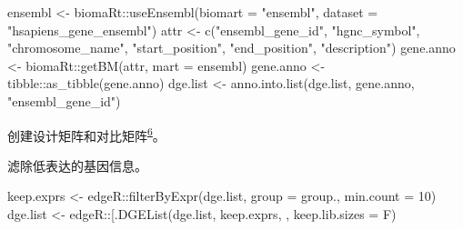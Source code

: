 \documentclass[
]{article}
\newenvironment{Shaded}{\begin{snugshade}}{\end{snugshade}}
\newcommand{\AttributeTok}[1]{\textcolor[rgb]{0.77,0.63,0.00}{#1}}
\newcommand{\DecValTok}[1]{\textcolor[rgb]{0.00,0.00,0.81}{#1}}
\newcommand{\FunctionTok}[1]{\textcolor[rgb]{0.00,0.00,0.00}{#1}}
\newcommand{\NormalTok}[1]{#1}
\newcommand{\OtherTok}[1]{\textcolor[rgb]{0.56,0.35,0.01}{#1}}
\newcommand{\SpecialCharTok}[1]{\textcolor[rgb]{0.00,0.00,0.00}{#1}}
\newcommand{\StringTok}[1]{\textcolor[rgb]{0.31,0.60,0.02}{#1}}
\begin{document}
\begin{Shaded}
\begin{Highlighting}[]
\NormalTok{ensembl }\OtherTok{\textless{}{-}}\NormalTok{ biomaRt}\SpecialCharTok{::}\FunctionTok{useEnsembl}\NormalTok{(}\AttributeTok{biomart =} \StringTok{"ensembl"}\NormalTok{, }\AttributeTok{dataset =} \StringTok{"hsapiens\_gene\_ensembl"}\NormalTok{)}
\NormalTok{attr }\OtherTok{\textless{}{-}} \FunctionTok{c}\NormalTok{(}\StringTok{"ensembl\_gene\_id"}\NormalTok{, }\StringTok{"hgnc\_symbol"}\NormalTok{, }\StringTok{"chromosome\_name"}\NormalTok{,}
        \StringTok{"start\_position"}\NormalTok{, }\StringTok{"end\_position"}\NormalTok{, }\StringTok{"description"}\NormalTok{)}
\NormalTok{gene.anno }\OtherTok{\textless{}{-}}\NormalTok{ biomaRt}\SpecialCharTok{::}\FunctionTok{getBM}\NormalTok{(attr, }\AttributeTok{mart =}\NormalTok{ ensembl)}
\NormalTok{gene.anno }\OtherTok{\textless{}{-}}\NormalTok{ tibble}\SpecialCharTok{::}\FunctionTok{as\_tibble}\NormalTok{(gene.anno)}
\NormalTok{dge.list }\OtherTok{\textless{}{-}} \FunctionTok{anno.into.list}\NormalTok{(dge.list, gene.anno, }\StringTok{"ensembl\_gene\_id"}\NormalTok{)}
\end{Highlighting}
\end{Shaded}

创建设计矩阵和对比矩阵\textsuperscript{\protect\hyperlink{ref-law_guide_2020}{6}}。

\begin{Shaded}
\end{Shaded}

滤除低表达的基因信息。

\begin{Shaded}
\begin{Highlighting}[]
\NormalTok{keep.exprs }\OtherTok{\textless{}{-}}\NormalTok{ edgeR}\SpecialCharTok{::}\FunctionTok{filterByExpr}\NormalTok{(dge.list, }\AttributeTok{group =}\NormalTok{ group., }\AttributeTok{min.count =} \DecValTok{10}\NormalTok{)}
\NormalTok{dge.list }\OtherTok{\textless{}{-}}\NormalTok{ edgeR}\SpecialCharTok{::}\StringTok{\textasciigrave{}}\AttributeTok{[.DGEList}\StringTok{\textasciigrave{}}\NormalTok{(dge.list, keep.exprs, , }\AttributeTok{keep.lib.sizes =}\NormalTok{ F)}
\end{Highlighting}
\end{Shaded}
\end{document}
